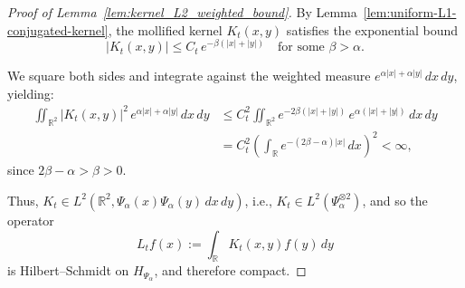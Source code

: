 \begin{proof}[Proof of Lemma~\ref{lem:kernel_L2_weighted_bound}]
By Lemma~\ref{lem:uniform-L1-conjugated-kernel}, the mollified kernel \( K_t(x,y) \) satisfies the exponential bound
\[
|K_t(x,y)| \leq C_t \, e^{-\beta(|x| + |y|)} \quad \text{for some } \beta > \alpha.
\]

We square both sides and integrate against the weighted measure \( e^{\alpha|x| + \alpha|y|}\, dx\, dy \), yielding:
\[
\begin{aligned}
\iint_{\mathbb{R}^2} |K_t(x,y)|^2\, e^{\alpha|x| + \alpha|y|}\, dx\, dy
&\le C_t^2 \iint_{\mathbb{R}^2} e^{-2\beta(|x| + |y|)}\, e^{\alpha(|x| + |y|)}\, dx\, dy \\
&= C_t^2 \left( \int_{\mathbb{R}} e^{-(2\beta - \alpha)|x|}\, dx \right)^2 < \infty,
\end{aligned}
\]
since \( 2\beta - \alpha > \beta > 0 \).

\medskip
\noindent Thus, \( K_t \in L^2(\mathbb{R}^2, \Psi_\alpha(x)\Psi_\alpha(y)\, dx\, dy) \), i.e., \( K_t \in L^2(\Psi_\alpha^{\otimes 2}) \), and so the operator
\[
L_t f(x) := \int_{\mathbb{R}} K_t(x,y) f(y)\, dy
\]
is Hilbert–Schmidt on \( H_{\Psi_\alpha} \), and therefore compact.
\end{proof}
